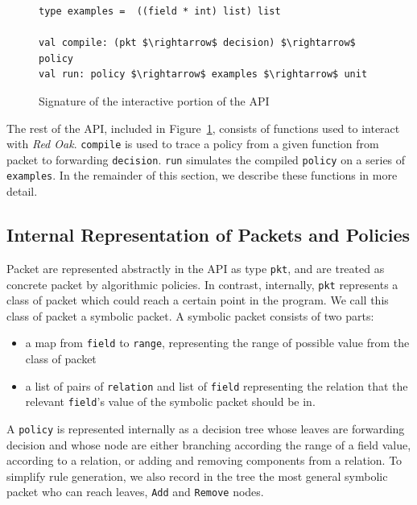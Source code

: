 \documentclass[preprint]{sigplanconf}
\begin{document}
\begin{figure}[ht]
  \begin{lstlisting}[mathescape]
type examples =  ((field * int) list) list
  
val compile: (pkt $\rightarrow$ decision) $\rightarrow$ policy
val run: policy $\rightarrow$ examples $\rightarrow$ unit
  \end{lstlisting}

  \caption{Signature of the interactive portion of the API}
  \label{fig:build_api}
\end{figure}


The rest of the API, included in Figure~\ref{fig:build_api}, consists of functions used to interact with \textit{Red Oak}. \lstinline|compile| is used to trace a policy from a given function from packet to forwarding \lstinline|decision|. \lstinline|run| simulates the compiled \lstinline|policy| on a series of \lstinline|examples|. In the remainder of this section, we describe these functions in more detail.

\subsection*{Internal Representation of Packets and Policies}

Packet are represented abstractly in the API as type \lstinline|pkt|, and are treated as concrete packet by algorithmic policies. In contrast, internally, \lstinline|pkt| represents a class of packet which could reach a certain point in the program. We call this class of packet a symbolic packet.
A symbolic packet consists of two parts:
\begin{itemize}
\item a map from \lstinline|field| to \lstinline|range|, representing the range of possible value from the class of packet
  \item a list of pairs of \lstinline|relation| and list of \lstinline|field| representing the relation that the relevant \lstinline|field|'s value of the symbolic packet should be in. 
  \end{itemize}
  
A \lstinline|policy| is represented internally as a decision tree whose leaves are forwarding decision and whose node are either branching according the range of a field value, according to a relation, or adding and removing components from a relation. To simplify rule generation, we also record in the tree the most general symbolic packet who can reach leaves, \lstinline|Add| and \lstinline|Remove| nodes.
\end{document}
